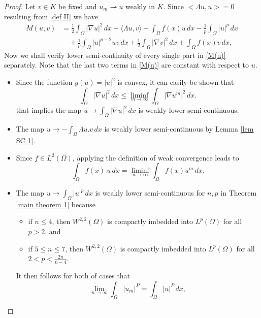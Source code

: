 \documentclass[10pt,a4paper]{amsart}
\numberwithin{equation}{section}
\begin{document}
\begin{proof}
 Let \( v \in  K\) be fixed and \(u_m\rightharpoonup u\) weakly in \(K\).
Since $<\Lambda u , u> = 0 $ resulting from \eqref{def II} we have
\begin{equation}\label{M(u)}
\begin{aligned}
M(u,v)
& =\frac{1}{2}\int_{\Omega} |\nabla u|^2\,dx -\langle\Lambda u , v\rangle
 -\int_{\Omega} f(x)u\,dx-\frac{1}{p}\int_{\Omega}  |u|^{p}\,dx  \\
&\quad +  \frac{1}{p}\int_{\Omega}  |u|^{p-2}uv\,dx+ \frac{1}{2}
\int_{\Omega} |\nabla v|^2\,dx+\int_{\Omega} f(x)v\,dx,
\end{aligned}
\end{equation}
Now we shall verify lower semi-continuity of every single part in \eqref{M(u)} separately.
Note that the last two terms in \eqref{M(u)} are constant  with respect to  $u$.
\begin{itemize}
 \item Since the function \(g(u) = |u|^2 \) is convex, it can easily be shown that
\[
 \int_{\Omega}|\nabla u|^2\,dx\leq \liminf_{m \to \infty}\int_{\Omega}|\nabla u^m|^2\,dx .
\]
 that implies the map \( u\to\int_{\Omega}|\nabla u|^2  \,dx\) is weakly lower
 semi-continuous.

 \item The map \( u\to-\int_{\Omega}\Lambda u. v \,dx\) is weakly lower semi-continuous
 by Lemma \ref{lem SC 1}.

 \item  Since \(f \in L^2(\Omega)\), applying the definition of weak convergence
 leads to
 \[
 \int_{\Omega}f(x)\  u  \,dx=\liminf_{n\to \infty}\int_{\Omega}f(x) u^m\,dx.
 \]

 \item The map \( u\to\int_{\Omega}|u|^p\,dx\) is weakly lower semi-continuous for
 \( n,p \) in Theorem \ref{main theorem 1} because
\begin{itemize}
       \item[(i)] if \(n\leq 4\), then  \(W^{2,2}(\Omega)\) is compactly imbedded
       into \( L^p(\Omega)\) for all \(  p>2\), and
       \item[(ii)] if \(5\leq n\leq 7\), then \(W^{2,2}(\Omega)\) is compactly imbedded
       into \( L^p(\Omega)\) for all \( 2<p< \frac{2n}{n-4}\).
\end{itemize}

It then follows for both of cases that
\[
\lim_{n\to \infty}\int_{\Omega}| u_m|^P=\int_{\Omega}| u|^P\,dx ,
\]


\end{itemize}
\end{proof}
\end{document}
